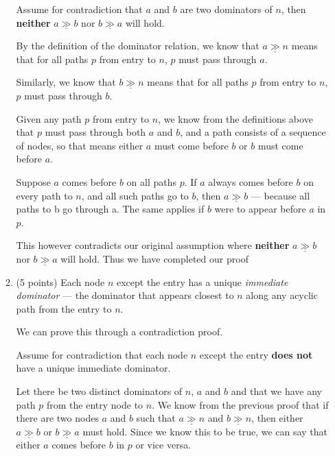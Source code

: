 \documentclass[12pt]{article}
\newcommand{\dom}{\underline{\gg}}
\begin{document}
\begin{enumerate}
\begin{enumerate}
\begin{mdframed}
      
      Assume for contradiction that $a$ and $b$ are two dominators of $n$, then \textbf{neither}
    $a \dom b$ nor $b \dom a$ will hold.
    \vspace{0.5em}

    By the definition of the dominator relation, we know that $a \dom n$ means that for all paths $p$ from entry to $n$, $p$ must pass through $a$.
    \vspace{0.5em}

    Similarly, we know that $b \dom n$ means that for all paths $p$ from entry to $n$, $p$ must pass through $b$.

    \vspace{0.5em}

    Given any path $p$ from entry to $n$, we know from the definitions above that $p$ must pass through both $a$ and $b$, and a path consists of a sequence of nodes, so that means either $a$ must come before $b$ or $b$ must come before $a$.
\vspace{0.5em}


    Suppose $a$ comes before $b$ on all paths $p$. If $a$ always comes before $b$ on every path to $n$, and all such paths go to $b$, then $a \dom b$ — because all paths to b go through a. The same applies if $b$ were to appear before $a$ in $p$.
    
    \vspace{0.5em}

    This however contradicts our original assumption where \textbf{neither} $a \dom b$ nor $b \dom a$ will hold. Thus we have completed our proof
    
    \end{mdframed}

    \item (5 points) Each node $n$ except the entry has a unique
    \emph{immediate dominator} --- the dominator that appears closest to $n$
    along any acyclic path from the entry to $n$.
    \begin{mdframed}

      We can prove this through a contradiction proof.

      \vspace{0.5em}

      Assume for contradiction that each node $n$ except the entry \textbf{does not} have a unique immediate dominator.

      \vspace{0.5em}
            Let there be two distinct dominators of $n$, $a$ and $b$ and that we have any path $p$ from the entry node to $n$. We know from the previous proof that if there are two nodes $a$ and $b$ such that $a \dom n$ and $b \dom n$, then either
            $a \dom b$ or $b \dom a$ must hold. Since we know this to be true, we can say that either $a$ comes before $b$ in $p$ or vice versa.
                   

\end{mdframed}
\end{enumerate}
\end{enumerate}
\end{document}
